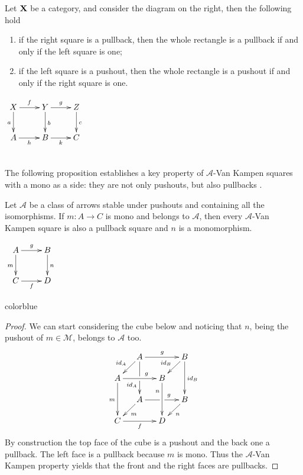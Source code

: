 \documentclass[a4paper,UKenglish,cleveref,pdftex,thm-restate,numberwithinsect]{lipics-v2021}
\newcommand{\full}[1]{{color{blue}#1}}
\newcommand{\full}[1]{}
\newcommand{\id}[1]{\mathsf{id}_{#1}}
\def\C{\textbf {\textup{C}}}
\def\X{\textbf {\textup{X}}}
\begin{document}
\noindent 
\parbox{10.5cm}{\begin{lemma}\label{lem:popb1} \label{lem:pb1} \label{lem:po1}
Let $\X$ be a category, and consider the diagram  on the right, then the following hold
	\begin{enumerate}
		\item if the right square is a pullback, then the whole rectangle is a pullback if and only if the left square is one;
		\item if the left square is a pushout, 	then the whole rectangle is a pushout if and only if the right square is one.
	\end{enumerate}
\end{lemma}}
\parbox{4cm}{$\xymatrix{X \ar[d]_{a} \ar[r]^{f}& \ar[r]^{g} Y \ar[d]^{b}& Z \ar[d]^{c}\\ A \ar[r]_{h}& B \ar[r]_{k}& C}$}\\

The following proposition establishes a key property of $\mathcal{A}$-Van Kampen squares with a mono as a side: they are not only pushouts, but also pullbacks \cite{ehrig2004adhesive,BehrHK23,lack2005adhesive}.

\noindent 
\parbox{11.5cm}{\begin{proposition}\label{prop:pbpo} Let $\mathcal{A}$ be a class of arrows stable under pushouts and containing all the isomorphisms.  If $m\colon A\to C$ is mono and belongs to $\mathcal{A}$, then every $\mathcal{A}$-Van Kampen square
	is also a pullback square and $n$ is a monomorphism.
\end{proposition}}
\parbox{2cm}{\vspace{1.5ex}$\xymatrix{A\ar[r]^{g} \ar[d]_{m} & B \ar[d]^{n} \\ C \ar[r]_{f}  & D}$}

\full{ 
\begin{proof}
	We can start considering the cube below and noticing that $n$, being the pushout of $m\in \mathcal{M}$, belongs to $\mathcal{A}$ too.
	\[\xymatrix@C=13pt@R=13pt{&A\ar[dd]|\hole_(.65){\id{A}}\ar[rr]^{g} \ar[dl]_{\id{A}} && B \ar[dd]^{\id{B}} \ar[dl]_{\id{B}} \\ A  \ar[dd]_{m}\ar[rr]^(.65){g} & & B \ar[dd]_(.3){n}\\&A\ar[rr]|\hole^(.65){g} \ar[dl]^{m} && B \ar[dl]^{n} \\C \ar[rr]_{f} & & D}\]
	By construction the top face of the cube is a pushout and the back one a pullback. The left face is a pullback because $m$ is mono. Thus the $\mathcal{A}$-Van Kampen property yields that the front and the right faces are pullbacks.
\end{proof}}
\end{document}
